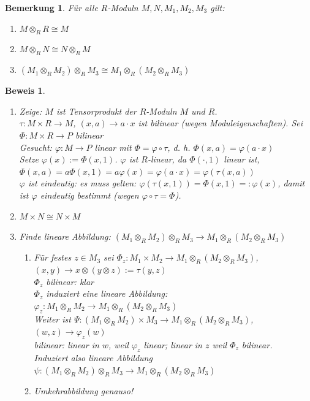 \documentclass[a4paper,12pt]{scrbook}
\theoremstyle{break}
\newtheorem{Bem}[Def]{Bemerkung}
\theoremstyle{nonumberbreak}
\newtheorem{Bew}{Beweis}
\theoremstyle{nonumberplain}
\begin{document}
\begin{Bem}
  Für alle $R$-Moduln $M, N, M_1, M_2, M_3$ gilt:
  \begin{enumerate}
  	\item $M \otimes_R R \cong M$
  	\item $M \otimes_R N \cong N \otimes_R M$
  	\item $(M_1 \otimes_R M_2) \otimes_R M_3 \cong M_1 \otimes_R (M_2 \otimes_R M_3)$
  \end{enumerate}
\end{Bem}
\begin{Bew}
  \begin{enumerate}
    \item[a)] Zeige: $M$ ist Tensorprodukt der $R$-Moduln $M$ und $R$.\\
	  $\tau: M \times R \rightarrow M$, $(x,a) \rightarrow a \cdot x$ ist bilinear (wegen 
	  Moduleigenschaften). Sei $\Phi: M \times R \rightarrow P$ bilinear\\
	  Gesucht: $\varphi: M \rightarrow P$ linear mit $\Phi = \varphi \circ \tau$, d. h. 
	  $\Phi(x,a) = \varphi(a \cdot x)$\\
	  Setze $\varphi(x) := \Phi(x,1)$. $\varphi$ ist $R$-linear, da $\Phi( \cdot, 1)$ linear
	  ist, $\Phi(x,a) = a\Phi(x,1) = a\varphi(x) = \varphi(a \cdot x ) = \varphi(\tau(x,a))$\\
	  $\varphi$ ist eindeutig: es muss gelten: $\varphi(\tau(x,1)) = \Phi(x,1) =: \varphi(x)$, 
	  damit ist $\varphi$ eindeutig bestimmt (wegen $\varphi \circ \tau = \Phi$).
    \item[b)] $M \times N \cong N \times M$
    \item[c)] Finde lineare Abbildung: $(M_1 \otimes_R M_2) \otimes_R M_3 \rightarrow M_1 \otimes_R (M_2 \otimes_R M_3)$
	  \begin{enumerate}
	    \item[ 1. ] Für festes $z \in M_3$ sei $\Phi_z: M_1 \times M_2 \rightarrow M_1 \otimes_R (M_2 \otimes_R M_3)$,\\
		  $(x,y) \rightarrow x \otimes (y \otimes z) := \tau ( y,z )$\\
		  $\Phi_z$ bilinear: klar\\
		  $\Phi_z$ induziert eine lineare Abbildung: $\varphi_z: M_1 \otimes_R M_2 \rightarrow M_1 \otimes_R (M_2 \otimes_R M_3)$\\
		  Weiter ist $\Psi: ( M_1 \otimes_R M_2 ) \times M_3 \rightarrow M_1 \otimes_R (M_2 \otimes_R M_3)$,
		  $(w,z) \rightarrow \varphi_z (w)$\\
		  bilinear: linear in $w$, weil $\varphi_z$ linear; linear in $z$ weil $\Phi_z$ bilinear.\\
		  Induziert also lineare Abbildung $\psi: (M_1 \otimes_R M_2) \otimes_R M_3 \rightarrow M_1 \otimes_R (M_2 \otimes_R M_3)$
	    \item[2.] Umkehrabbildung genauso!
	  \end{enumerate}
  \end{enumerate}
\end{Bew}
\end{document}
